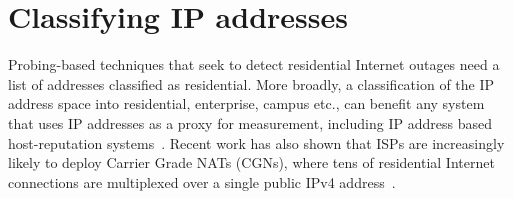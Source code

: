 


\section{Classifying IP addresses}

Probing-based techniques that seek to detect residential Internet
outages need a list of addresses classified as residential. More
broadly, a classification of the IP address space into residential,
enterprise, campus etc., can benefit any system that uses IP addresses
as a proxy for measurement, including IP address based host-reputation
systems~\cite{fail2ban,spamhaus}. Recent work has also shown
that ISPs are increasingly likely to deploy Carrier Grade NATs (CGNs),
where tens of residential Internet connections are multiplexed over a single
public IPv4 address~\cite{cgn-imc16}.

